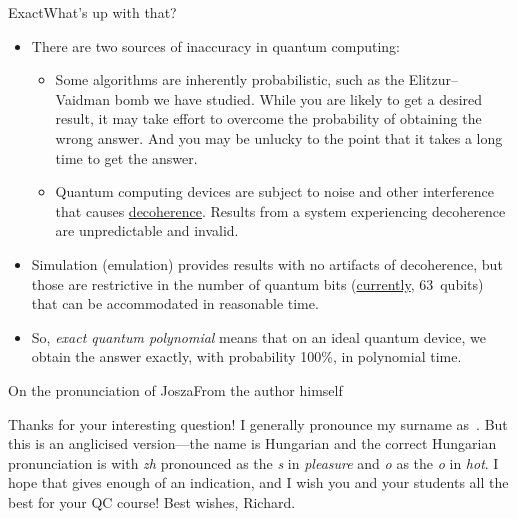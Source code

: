 \begin{frame}{Exact}{What's up with that?}
\begin{itemize}[<+->]
    \item There are two sources of inaccuracy in quantum computing:
    \begin{itemize}
        \item Some algorithms are inherently probabilistic, such as the Elitzur--Vaidman bomb we have studied. While you are likely to get a desired result, it may take effort to overcome the probability of obtaining the wrong answer.  And you may be unlucky to the point that it takes a long time to get the answer.
        \item Quantum computing devices are subject to noise and other interference that causes \href{https://en.wikipedia.org/wiki/Quantum_decoherence}{decoherence}.  Results from a system experiencing decoherence are unpredictable and invalid.
    \end{itemize}
    \item Simulation (emulation) provides results with no artifacts of decoherence, but those are restrictive in the number of quantum bits (\href{https://qiskit.org/documentation/tutorials/simulators/6_extended_stabilizer_tutorial.html}{currently}, 63~qubits) that can be accommodated in reasonable time.
    \item So, \emph{exact quantum polynomial} means that on an ideal quantum device, we obtain the answer exactly, with probability 100\%, in polynomial time.
\end{itemize}
\end{frame}

\begin{frame}{On the pronunciation of Josza}{From the author himself}

Thanks for your interesting question!  I generally pronounce my surname as~.
\SmallSkip{}
But this is an anglicised version---the name is Hungarian and the correct Hungarian pronunciation is   with \emph{zh} pronounced as the \emph{s} in \emph{pleasure} and \emph{o} as the \emph{o} in \emph{hot}.
\SmallSkip{}
I hope that gives enough of an indication, and I wish you and your students all the best for your QC course!
\BigSkip{}
Best wishes,  Richard.
\end{frame}

